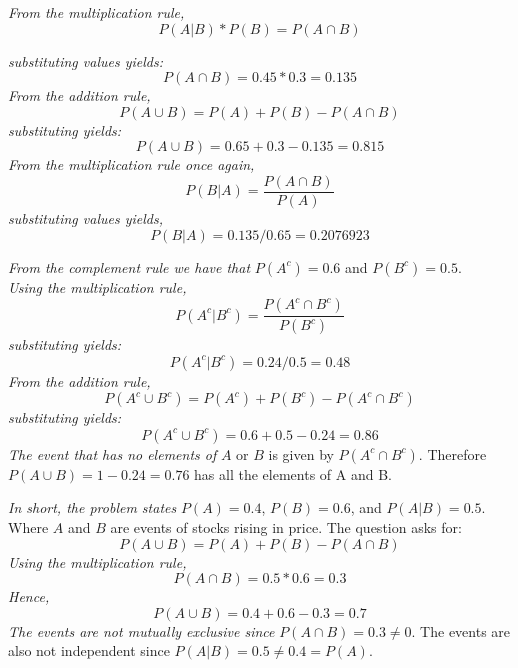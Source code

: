 \documentclass[
  11pt,
  letterpaper,
  DIV=11,
  numbers=noendperiod,
  oneside,
  open=any]{scrreprt}
\newenvironment{bsanswerkey}[2]{%
  \begin{tcolorbox}[bsbase, colback=bspaper2, colframe=bsline, fontupper=\small,
    title={\hypertarget{a-#1}{}\label{a-#1}\hyperlink{q-#1}{\textcolor{bsink2}{\MakeUppercase{#2}}}\hfill
      \hyperlink{q-#1}{\textcolor{bsaccent}{\normalfont\footnotesize back to page \pageref{q-#1}}}}]}%
  {\end{tcolorbox}}
\begin{document}
\begin{bsanswerkey}{bsans73}{Exercise 2, question 1}

\emph{From the multiplication rule,} \[P(A|B)*P(B)=P(A \cap B)\]

\emph{substituting values yields:} \[P(A \cap B)=0.45*0.3=0.135\]
\emph{From the addition rule,} \[P(A \cup B)=P(A)+P(B)-P(A \cap B)\]
\emph{substituting yields:} \[P(A \cup B)=0.65+0.3-0.135=0.815\]
\emph{From the multiplication rule once again,}
\[P(B|A)=\frac{P(A \cap B)}{P(A)}\] \emph{substituting values yields,}
\[P(B|A)=0.135/0.65=0.2076923\]

\end{bsanswerkey}

\begin{bsanswerkey}{bsans74}{Exercise 2, question 2}

\emph{From the complement rule we have that} \(P(A^c)=0.6\) and
\(P(B^c)=0.5\).\\
\emph{Using the multiplication rule,}
\[P(A^c|B^c)=\frac{P(A^c \cap B^c)}{P(B^c)}\] \emph{substituting
yields:} \[P(A^c|B^c)=0.24/0.5=0.48\] \emph{From the addition rule,}
\[P(A^c \cup B^c)=P(A^c)+P(B^c)-P(A^c \cap B^c)\] \emph{substituting
yields:} \[P(A^c \cup B^c)=0.6+0.5-0.24=0.86\] \emph{The event that has
no elements of} \(A\) or \(B\) is given by \(P(A^c \cap B^c)\).
Therefore \(P(A \cup B)=1-0.24=0.76\) has all the elements of A and B.

\end{bsanswerkey}

\begin{bsanswerkey}{bsans75}{Exercise 2, question 3}

\emph{In short, the problem states} \(P(A)=0.4\), \(P(B)=0.6\), and
\(P(A|B)=0.5\). Where \(A\) and \(B\) are events of stocks rising in
price. The question asks for: \[P(A \cup B)=P(A)+P(B)-P(A \cap B)\]
\emph{Using the multiplication rule,} \[P(A \cap B)=0.5*0.6=0.3\]
\emph{Hence,} \[P(A \cup B)=0.4+0.6-0.3=0.7\] \emph{The events are not
mutually exclusive since} \(P(A \cap B)=0.3 \neq 0\). The events are
also not independent since \(P(A|B)=0.5 \neq 0.4=P(A)\).

\end{bsanswerkey}
\end{document}
